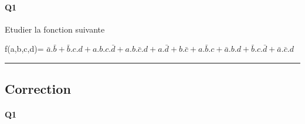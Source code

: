 \pagebreak

\paragraph{Q1}

Etudier la fonction suivante

f(a,b,c,d)= $ \bar a.\bar b + \bar b.c.d + a.b.c.\bar d + a.b.\bar c.d  +  a.\bar d + b.\bar c + a.\bar b.c + \bar a.b.d + \bar b.c.\bar d + \bar a.\bar c.d $


\hrule width 1\linewidth
\pagebreak

\subsection{Correction}


\paragraph{Q1}

